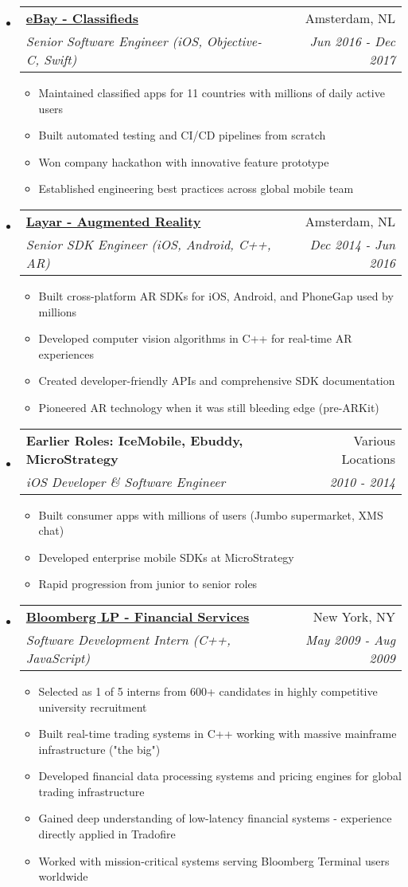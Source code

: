 \documentclass[letterpaper,11pt]{article}
\makeatletter
\newcommand{\resitem}[1]{\item #1 \vspace{-2pt}}
\newcommand{\ressubheading}[4]{
\begin{tabular*}{7.0in}{l@{\extracolsep{\fill}}r}
    \textbf{#1} & #2 \\
    \textit{#3} & \textit{#4} \\
\end{tabular*}\vspace{-6pt}}
\makeatother
\begin{document}
\begin{itemize}
\item
    \ressubheading{\href{https://www.markplaats.nl/}{eBay - Classifieds}}{Amsterdam, NL}{Senior Software Engineer (iOS, Objective-C, Swift)}{Jun 2016 - Dec 2017}
    \begin{itemize}
        \resitem{Maintained classified apps for 11 countries with millions of daily active users}
        \resitem{Built automated testing and CI/CD pipelines from scratch}
        \resitem{Won company hackathon with innovative feature prototype}
        \resitem{Established engineering best practices across global mobile team}
    \end{itemize}

\item
    \ressubheading{\href{https://www.layar.com/}{Layar - Augmented Reality}}{Amsterdam, NL}{Senior SDK Engineer (iOS, Android, C++, AR)}{Dec 2014 - Jun 2016}
    \begin{itemize}
        \resitem{Built cross-platform AR SDKs for iOS, Android, and PhoneGap used by millions}
        \resitem{Developed computer vision algorithms in C++ for real-time AR experiences}
        \resitem{Created developer-friendly APIs and comprehensive SDK documentation}
        \resitem{Pioneered AR technology when it was still bleeding edge (pre-ARKit)}
    \end{itemize}

\item
    \ressubheading{Earlier Roles: IceMobile, Ebuddy, MicroStrategy}{Various Locations}{iOS Developer \& Software Engineer}{2010 - 2014}
    \begin{itemize}
        \resitem{Built consumer apps with millions of users (Jumbo supermarket, XMS chat)}
        \resitem{Developed enterprise mobile SDKs at MicroStrategy}
        \resitem{Rapid progression from junior to senior roles}
    \end{itemize}
    
\item
    \ressubheading{\href{http://www.bloomberg.com}{Bloomberg LP - Financial Services}}{New York, NY}{Software Development Intern (C++, JavaScript)}{May 2009 - Aug 2009}
    \begin{itemize}
      \resitem{Selected as 1 of 5 interns from 600+ candidates in highly competitive university recruitment}
      \resitem{Built real-time trading systems in C++ working with massive mainframe infrastructure ("the big")}
      \resitem{Developed financial data processing systems and pricing engines for global trading infrastructure}
      \resitem{Gained deep understanding of low-latency financial systems - experience directly applied in Tradofire}
      \resitem{Worked with mission-critical systems serving Bloomberg Terminal users worldwide}
    \end{itemize}

\end{itemize}
\end{document}
